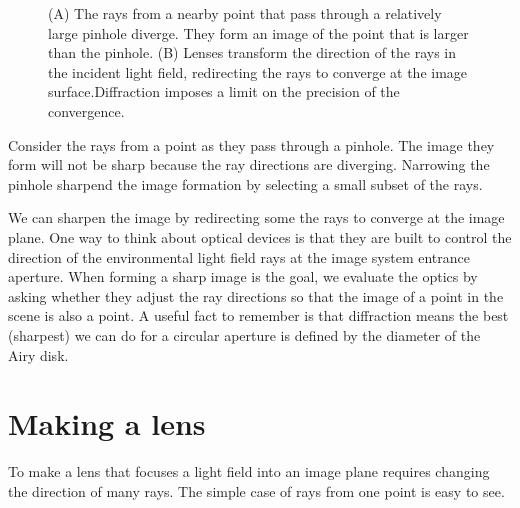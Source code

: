 \documentclass[
  letterpaper,
]{book}
\begin{document}
\begin{figure}


\caption{\label{fig-pinhole-rays}(A) The rays from a nearby point that
pass through a relatively large pinhole diverge. They form an image of
the point that is larger than the pinhole. (B) Lenses transform the
direction of the rays in the incident light field, redirecting the rays
to converge at the image surface.Diffraction imposes a limit on the
precision of the convergence.}

\end{figure}%

Consider the rays from a point as they pass through a pinhole. The image
they form will not be sharp because the ray directions are diverging.
Narrowing the pinhole sharpend the image formation by selecting a small
subset of the rays.

We can sharpen the image by redirecting some the rays to converge at the
image plane. One way to think about optical devices is that they are
built to control the direction of the environmental light field rays at
the image system entrance aperture. When forming a sharp image is the
goal, we evaluate the optics by asking whether they adjust the ray
directions so that the image of a point in the scene is also a point. A
useful fact to remember is that diffraction means the best (sharpest) we
can do for a circular aperture is defined by the diameter of the Airy
disk.

\section{Making a lens}\label{making-a-lens}

To make a lens that focuses a light field into an image plane requires
changing the direction of many rays. The simple case of rays from one
point is easy to see.
\end{document}
